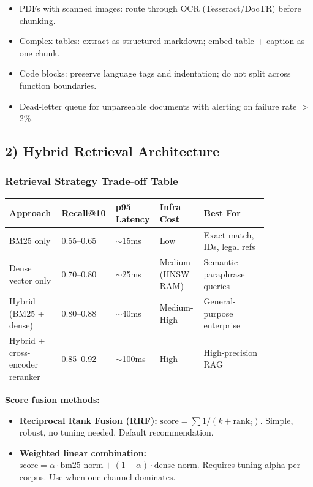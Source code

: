 \begin{itemize}
  \item PDFs with scanned images: route through OCR (Tesseract/DocTR) before chunking.
  \item Complex tables: extract as structured markdown; embed table + caption as one chunk.
  \item Code blocks: preserve language tags and indentation; do not split across function boundaries.
  \item Dead-letter queue for unparseable documents with alerting on failure rate $>$ 2\%.
\end{itemize}

\subsection*{2) Hybrid Retrieval Architecture}

\subsubsection*{Retrieval Strategy Trade-off Table}

\small
\begin{tabular}{|p{0.18\linewidth}|p{0.13\linewidth}|p{0.13\linewidth}|p{0.16\linewidth}|p{0.24\linewidth}|}
\hline
\textbf{Approach} & \textbf{Recall@10} & \textbf{p95 Latency} & \textbf{Infra Cost} & \textbf{Best For} \\
\hline
BM25 only & 0.55--0.65 & $\sim$15ms & Low & Exact-match, IDs, legal refs \\
\hline
Dense vector only & 0.70--0.80 & $\sim$25ms & Medium (HNSW RAM) & Semantic paraphrase queries \\
\hline
Hybrid (BM25 + dense) & 0.80--0.88 & $\sim$40ms & Medium-High & General-purpose enterprise \\
\hline
Hybrid + cross-encoder reranker & 0.85--0.92 & $\sim$100ms & High & High-precision RAG \\
\hline
\end{tabular}
\normalsize

\textbf{Score fusion methods:}

\begin{itemize}
  \item \textbf{Reciprocal Rank Fusion (RRF):} $\text{score} = \sum 1/(k + \text{rank}_i)$. Simple, robust, no tuning needed. Default recommendation.
  \item \textbf{Weighted linear combination:} $\text{score} = \alpha \cdot \text{bm25\_norm} + (1-\alpha) \cdot \text{dense\_norm}$. Requires tuning alpha per corpus. Use when one channel dominates.
\end{itemize}

